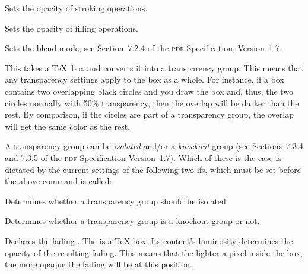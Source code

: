 \begin{command}{\pgfsys@stroke@opacity{}}
    Sets the opacity of stroking operations.
\end{command}

\begin{command}{\pgfsys@fill@opacity{}}
    Sets the opacity of filling operations.
\end{command}

\begin{command}{\pgfsys@blend@mode{}}
    Sets the blend mode, see Section~7.2.4 of the \textsc{pdf} Specification,
    Version~1.7.
\end{command}

\begin{command}{\pgfsys@transparencygroupfrombox{}}
    This takes a \TeX\ box and converts it into a transparency group. This
    means that any transparency settings apply to the box as a whole. For
    instance, if a box contains two overlapping black circles and you draw the
    box and, thus, the two circles normally with 50\% transparency, then the
    overlap will be darker than the rest. By comparison, if the circles are
    part of a transparency group, the overlap will get the same color as the
    rest.
\end{command}

A transparency group can be \emph{isolated} and/or a \emph{knockout} group (see
Sections~7.3.4 and 7.3.5 of the \textsc{pdf} Specification Version~1.7). Which
of these is the case is dictated by the current settings of the following two
ifs, which must be set before the above command is called:

{\let\ifpgfsys@transparency@group@isolated=\relax
\begin{command}{\ifpgfsys@transparency@group@isolated}
    Determines whether a transparency group should be isolated.
\end{command}
}

{\let\ifpgfsys@transparency@group@knockout=\relax
\begin{command}{\ifpgfsys@transparency@group@knockout}
    Determines whether a transparency group is a knockout group or not.
\end{command}
}

\begin{command}{\pgfsys@fadingfrombox{}}
    Declares the fading . The  is a \TeX-box. Its
    content's luminosity determines the opacity of the resulting fading. This
    means that the lighter a pixel inside the box, the more opaque the fading
    will be at this position.
\end{command}

